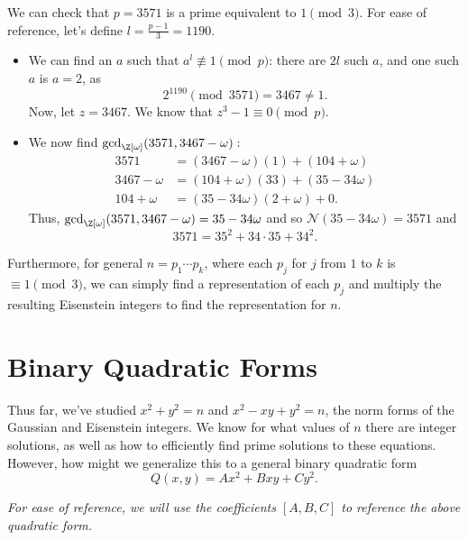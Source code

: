 \documentclass[11pt]{article}
\begin{document}
\begin{answer}
We can check that $p = 3571$ is a prime equivalent to $1 \pmod 3$. For ease of reference, let's define $l = \frac{p-1}{3} = 1190$.
\begin{itemize}
    \item We can find an $a$ such that $a^l \not\equiv 1 \pmod p$: there are $2l$ such $a$, and one such $a$ is $a=2$, as
    \[
        2^{1190} \pmod{3571} = 3467 \neq 1.
    \]
    Now, let $z = 3467$. We know that $z^3 - 1 \equiv 0 \pmod p$. 
    \item We now find $\mathrm{gcd}_{\Z[\omega]}(3571, 3467-\omega):$
    \begin{align*}
        3571 &= (3467-\omega)(1) + (104 + \omega) \\
        3467 - \omega &= (104 + \omega)(33) + (35 - 34\omega) \\
        104 + \omega &= (35 - 34\omega)(2+\omega) + 0.
    \end{align*}
    Thus, $\mathrm{gcd}_{\Z[\omega]}(3571, 3467-\omega) = 35 - 34\omega$ and so $\mathcal{N}(35 - 34\omega) = 3571$ and
    \[
        \boxed{3571 = 35^2 + 34\cdot35 + 34^2}.
    \]
\end{itemize}
\end{answer}



\begin{remark}
    Furthermore, for general $n = p_1 \cdots p_k$, where each $p_j$ for $j$ from $1$ to $k$ is $\equiv 1 \pmod{3}$,
    we can simply find a representation of each $p_j$ and multiply the resulting Eisenstein integers to find the representation for $n$.    
\end{remark}

\section{Binary Quadratic Forms}

Thus far, we've studied $x^2 + y^2 = n$ and $x^2 - xy + y^2 = n$, the norm forms of the Gaussian and Eisenstein integers. 
We know for what values of $n$ there are integer solutions, as well as how to efficiently find prime solutions to these equations. \\

However, how might we generalize this to a general binary quadratic form
\[
    Q(x, y) = Ax^2 + Bxy + Cy^2.
\]

\textit{For ease of reference, we will use the coefficients $[A, B, C]$ to reference the above quadratic form.}
\end{document}
